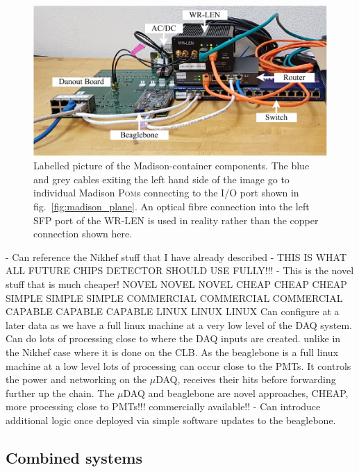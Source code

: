 \begin{figure} %
    \includegraphics[width=\textwidth]{diagrams/5-daq/madison_box.pdf}
    \caption[Labelled picture of the Madison-container components.]
    {Labelled picture of the Madison-container components. The blue and grey cables exiting the
        left hand side of the image go to individual Madison \textsc{Pom}s connecting to the I/O port shown
        in fig.~\ref{fig:madison_plane}. An optical fibre connection into the left SFP port of the
        WR-LEN is used in reality rather than the copper connection shown here.}
    \label{fig:madison_box}
\end{figure}

- Can reference the Nikhef stuff that I have already described - THIS IS WHAT ALL FUTURE CHIPS
DETECTOR SHOULD USE FULLY!!! - This is the novel stuff that is much cheaper! NOVEL NOVEL NOVEL
CHEAP CHEAP CHEAP SIMPLE SIMPLE SIMPLE COMMERCIAL COMMERCIAL COMMERCIAL CAPABLE CAPABLE CAPABLE
LINUX LINUX LINUX Can configure at a later data as we have a full linux machine at a very low
level of the DAQ system. Can do lots of processing close to where the DAQ inputs are created.
unlike in the Nikhef case where it is done on the CLB. As the beaglebone is a full linux machine
at a low level lots of processing can occur close to the PMTs. It controls the power and
networking on the $\mu$DAQ, receives their hits before forwarding further up the chain. The
$\mu$DAQ and beaglebone are novel approaches, CHEAP, more processing close to PMTs!!! commercially
available!! - Can introduce additional logic once deployed via simple software updates to the
beaglebone.

\subsection{Combined systems} %
\label{sec:daq_hard_combined} %

